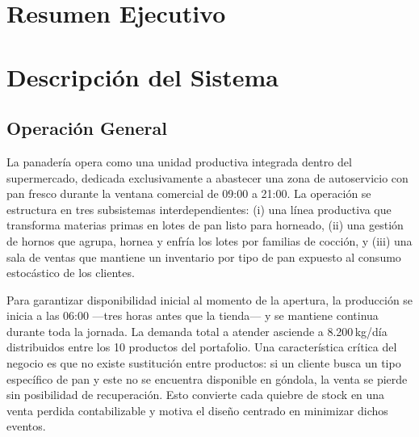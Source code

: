 \documentclass[10pt, a4paper]{article}
\begin{document}
\tableofcontents
\newpage

\section{Resumen Ejecutivo}
\label{sec:resumen}


\newpage

\section{Descripci\'on del Sistema}
\label{sec:sistema}

\subsection{Operaci\'on General}

La panader\'ia opera como una unidad productiva integrada dentro del
supermercado, dedicada exclusivamente a abastecer una zona de autoservicio con
pan fresco durante la ventana comercial de 09:00 a 21:00. La operaci\'on
se estructura en tres subsistemas interdependientes: (i) una l\'inea
productiva que transforma materias primas en lotes de pan listo para horneado,
(ii) una gesti\'on de hornos que agrupa, hornea y enfr\'ia los lotes por
familias de cocci\'on, y (iii) una sala de ventas que mantiene un
inventario por tipo de pan expuesto al consumo estoc\'astico de los clientes.

Para garantizar disponibilidad inicial al momento de la apertura, la producci\'on
se inicia a las 06:00 ---tres horas antes que la tienda--- y se
mantiene continua durante toda la jornada. La demanda total a atender asciende
a 8.200\,kg/d\'ia distribuidos entre los 10 productos del portafolio.
Una caracter\'istica cr\'itica del negocio es que no existe sustituci\'on
entre productos: si un cliente busca un tipo espec\'ifico de pan y este no se
encuentra disponible en g\'ondola, la venta se pierde sin posibilidad de
recuperaci\'on. Esto convierte cada quiebre de stock en una venta perdida
contabilizable y motiva el dise\~no centrado en minimizar dichos eventos.
\end{document}

